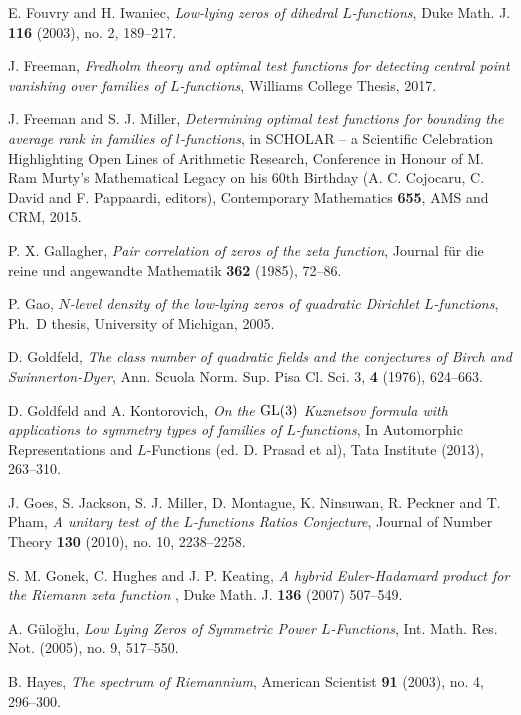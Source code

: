 \documentclass[12pt, reqno]{amsart}
\numberwithin{equation}{section}
\theoremstyle{definition}
\theoremstyle{remark}
\begin{document}
\begin{thebibliography}{FMGGGG15}
\newblock E. Fouvry and H. Iwaniec, \emph{Low-lying zeros of dihedral
$L$-functions}, Duke Math. J. \textbf{116} (2003), no. 2, 189--217.

J. Freeman, \emph{Fredholm theory and optimal test functions for detecting central point vanishing over families of $L$-functions}, Williams College Thesis, 2017.

J. Freeman and S. J. Miller, \emph{\newblock Determining optimal test functions for bounding the average rank in
  families of $l$-functions}, in SCHOLAR -- a Scientific Celebration Highlighting Open Lines of Arithmetic Research, Conference in Honour of M. Ram Murty's Mathematical Legacy on his 60th Birthday (A. C. Cojocaru, C. David and F. Pappaardi, editors), Contemporary Mathematics \textbf{655}, AMS and CRM, 2015.

P. X. Gallagher, \emph{Pair correlation of zeros of the zeta function}, Journal für die reine und angewandte Mathematik \textbf{362} (1985), 72--86.

\newblock P. Gao, \emph{$N$-level density of the low-lying zeros of
quadratic Dirichlet $L$-functions}, Ph.~D thesis, University of
Michigan, 2005.

D. Goldfeld, \emph{The class number of quadratic fields and the
conjectures of Birch and Swinnerton-Dyer}, Ann. Scuola Norm. Sup.
Pisa Cl. Sci. 3, \textbf{4} (1976), 624--663.

\newblock D. Goldfeld and A. Kontorovich, \emph{On the ${\rm GL}(3)$ Kuznetsov formula with applications to symmetry types of families of $L$-functions}, In Automorphic Representations and $L$-Functions (ed. D. Prasad et al), Tata Institute (2013), 263--310.

J. Goes, S. Jackson, S. J. Miller, D. Montague, K. Ninsuwan, R. Peckner and T. Pham, \emph{A unitary test of the $L$-functions Ratios Conjecture}, Journal of Number Theory \textbf{130} (2010), no. 10, 2238--2258.

S. M. Gonek, C. Hughes and J. P. Keating, \emph{A hybrid Euler-Hadamard product for the Riemann zeta function }, Duke Math. J. \textbf{136} (2007) 507--549.

\newblock A. G\"ulo\u{g}lu, \emph{Low Lying Zeros of Symmetric
Power $L$-Functions},  Int. Math. Res. Not. (2005),  no. 9,
517--550.

B. Hayes, \emph{The spectrum of Riemannium}, American Scientist
\textbf{91} (2003), no. 4, 296--300.


\end{thebibliography}
\end{document}
